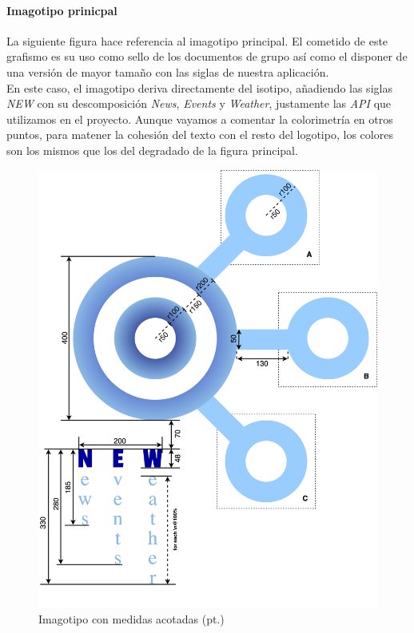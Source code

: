 \documentclass[../ei103948-project-documentation.tex]{subfiles}
\begin{document}
                            \newpage
                    
                    
                            \paragraph*{Imagotipo prinicpal}
                            La siguiente figura hace referencia al imagotipo principal. El cometido de este grafismo es su uso como sello de los documentos de grupo así como el disponer de una versión de mayor tamaño con las siglas de nuestra aplicación.\\
                    
                            En este caso, el imagotipo deriva directamente del isotipo, añadiendo las siglas \textit{NEW} con su descomposición \textit{News}, \textit{Events} y \textit{Weather}, justamente las \textit{API} que utilizamos en el proyecto. Aunque vayamos a comentar la colorimetría en otros puntos, para matener la cohesión del texto con el resto del logotipo, los colores son los mismos que los del degradado de la figura principal.
                    
                    
                            \begin{figure}[H]
                                \begin{center}
                                \includegraphics[scale=0.10]{images/LogoAcotadotexto.png}
                                \end{center}
                                \caption{Imagotipo con medidas acotadas (pt.)}
                            \end{figure}
                    
\end{document}
